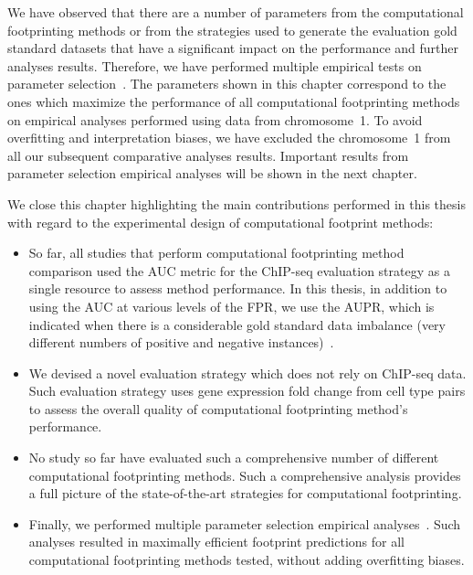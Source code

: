 We have observed that there are a number of parameters from the computational footprinting methods or from the strategies used to generate the evaluation gold standard datasets that have a significant impact on the performance and further analyses results. Therefore, we have performed multiple empirical tests on parameter selection~\citep{gusmao2014}. The parameters shown in this chapter correspond to the ones which maximize the performance of all computational footprinting methods on empirical analyses performed using data from chromosome~1. To avoid overfitting and interpretation biases, we have excluded the chromosome~1 from all our subsequent comparative analyses results. Important results from parameter selection empirical analyses will be shown in the next chapter.

We close this chapter highlighting the main contributions performed in this thesis with regard to the experimental design of computational footprint methods:
\begin{itemize}
\item So far, all studies that perform computational footprinting method comparison used the AUC metric for the ChIP-seq evaluation strategy as a single resource to assess method performance. In this thesis, in addition to using the AUC at various levels of the FPR, we use the AUPR, which is indicated when there is a considerable gold standard data imbalance (very different numbers of positive and negative instances)~\citep{davis2006,fawcett2006}.
\item We devised a novel evaluation strategy which does not rely on ChIP-seq data. Such evaluation strategy uses gene expression fold change from cell type pairs to assess the overall quality of computational footprinting method's performance.
\item No study so far have evaluated such a comprehensive number of different computational footprinting methods. Such a comprehensive analysis provides a full picture of the state-of-the-art strategies for computational footprinting.
\item Finally, we performed multiple parameter selection empirical analyses~\citep{gusmao2014}. Such analyses resulted in maximally efficient footprint predictions for all computational footprinting methods tested, without adding overfitting biases.
\end{itemize}


